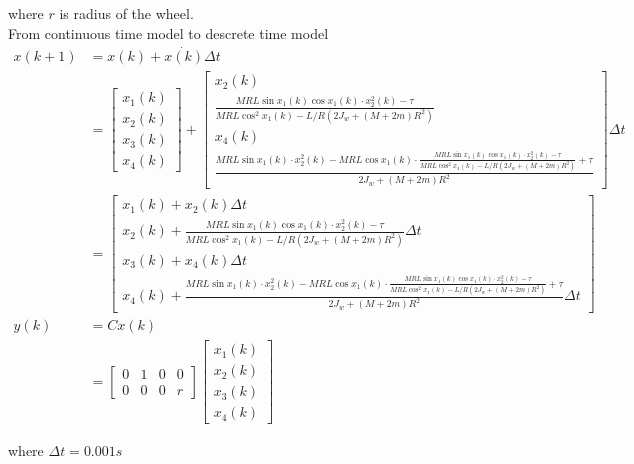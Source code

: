 \documentclass{article}
\begin{document}
where $r$ is radius of the wheel.\\
From continuous time model to descrete time model
\begin{align*}
    x(k+1) & =x(k)+\dot{x(k)}\Delta t \\
           & =
    \begin{bmatrix}
        x_1(k) \\x_2(k)\\x_3(k)\\x_4(k)
    \end{bmatrix}
    +
    \begin{bmatrix}
        x_2(k) \\
        \frac{MRL\sin x_1(k)\cos x_1(k)\cdot x_2^2(k)-\tau}
        {MRL\cos^2 x_1(k)-L/R(2J_w+(M+2m)R^2)}
        \\
        x_4(k) \\
        \frac{MRL\sin x_1(k)\cdot x_2^2(k)-MRL\cos x_1(k)\cdot
            \frac{MRL\sin x_1(k)\cos x_1(k)\cdot x_2^2(k)-\tau}
            {MRL\cos^2 x_1(k)-L/R(2J_w+(M+2m)R^2)}+\tau}
        {2J_w+(M+2m)R^2}
    \end{bmatrix}\Delta t \\
           & =
    \begin{bmatrix}
        x_1(k)+x_2(k)\Delta t \\
        x_2(k)+\frac{MRL\sin x_1(k)\cos x_1(k)\cdot x_2^2(k)-\tau}
        {MRL\cos^2 x_1(k)-L/R(2J_w+(M+2m)R^2)}\Delta t
        \\
        x_3(k)+x_4(k)\Delta t \\
        x_4(k)+\frac{MRL\sin x_1(k)\cdot x_2^2(k)-MRL\cos x_1(k)\cdot
            \frac{MRL\sin x_1(k)\cos x_1(k)\cdot x_2^2(k)-\tau}
            {MRL\cos^2 x_1(k)-L/R(2J_w+(M+2m)R^2)}+\tau}
        {2J_w+(M+2m)R^2}\Delta t
    \end{bmatrix}        \\
    y(k)   & =Cx(k)                   \\
           & =
    \begin{bmatrix}
        0 & 1 & 0 & 0 \\0&0&0&r
    \end{bmatrix}
    \begin{bmatrix}
        x_1(k) \\x_2(k)\\x_3(k)\\x_4(k)
    \end{bmatrix}
\end{align*}

where $\Delta t=0.001s$
\end{document}

